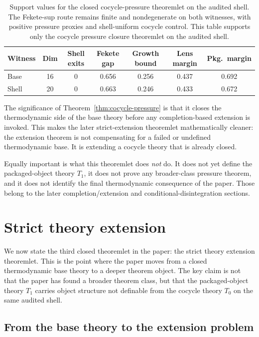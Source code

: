 \documentclass[11pt]{article}
\theoremstyle{definition}
\newcommand{\Tzero}{T_0}
\newcommand{\Tone}{T_1}
\begin{document}
\begin{table}[t]
\caption{Support values for the closed cocycle-pressure theoremlet on the audited shell.
The Fekete-sup route remains finite and nondegenerate on both witnesses,
with positive pressure proxies and shell-uniform cocycle control.
This table supports only the cocycle pressure closure theoremlet
on the audited shell.}
\label{tbl:pressure-closure-support}
\centering
\small
\begin{tabular}{@{}l c c c c c c@{}}
\toprule
Witness & Dim & Shell exits & Fekete gap & Growth bound & Lens margin & Pkg.\ margin \\
\midrule
Base  & 16 & 0 & 0.656 & 0.256 & 0.437 & 0.692 \\
Shell & 20 & 0 & 0.663 & 0.246 & 0.433 & 0.672 \\
\bottomrule
\end{tabular}
\end{table}
 
The significance of Theorem~\ref{thm:cocycle-pressure} is that it closes the thermodynamic side of the base theory before any completion-based extension is invoked. This makes the later strict-extension theoremlet mathematically cleaner: the extension theorem is not compensating for a failed or undefined thermodynamic base. It is extending a cocycle theory that is already closed.

Equally important is what this theoremlet does \emph{not} do. It does not yet define the packaged-object theory \(\Tone\), it does not prove any broader-class pressure theorem, and it does not identify the final thermodynamic consequence of the paper. Those belong to the later completion/extension and conditional-disintegration sections.
 \section{Strict theory extension}\label{sec:strict-extension}

We now state the third closed theoremlet in the paper: the strict theory extension theoremlet. This is the point where the paper moves from a closed thermodynamic base theory to a deeper theorem object. The key claim is not that the paper has found a broader theorem class, but that the packaged-object theory \(\Tone\) carries object structure not definable from the cocycle theory \(\Tzero\) on the same audited shell.

\subsection{From the base theory to the extension problem}
\end{document}
